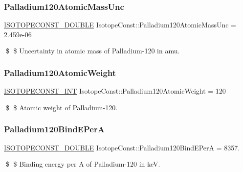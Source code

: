 \subsubsection{\texorpdfstring{Palladium120\+Atomic\+Mass\+Unc}{Palladium120AtomicMassUnc}}
{\footnotesize\ttfamily \mbox{\hyperlink{group___isotope_const-_macros_ga8f45a7272ce02c0b4c65c44636ed719a}{I\+S\+O\+T\+O\+P\+E\+C\+O\+N\+S\+T\+\_\+\+D\+O\+U\+B\+LE}} Isotope\+Const\+::\+Palladium120\+Atomic\+Mass\+Unc = 2.\+459e-\/06}

\$ \$ Uncertainty in atomic mass of Palladium-\/120 in amu. \mbox{\label{group___isotope_const-_palladium-_pd120_gadb79b870281725ce2295581c728921d9}} 
\subsubsection{\texorpdfstring{Palladium120\+Atomic\+Weight}{Palladium120AtomicWeight}}
{\footnotesize\ttfamily \mbox{\hyperlink{group___isotope_const-_macros_ga5f18360b3e99483a35c32d789e62621c}{I\+S\+O\+T\+O\+P\+E\+C\+O\+N\+S\+T\+\_\+\+I\+NT}} Isotope\+Const\+::\+Palladium120\+Atomic\+Weight = 120}

\$ \$ Atomic weight of Palladium-\/120. \mbox{\label{group___isotope_const-_palladium-_pd120_ga3f044373bf4c0c19006aad9205161bb7}} 
\subsubsection{\texorpdfstring{Palladium120\+Bind\+E\+PerA}{Palladium120BindEPerA}}
{\footnotesize\ttfamily \mbox{\hyperlink{group___isotope_const-_macros_ga8f45a7272ce02c0b4c65c44636ed719a}{I\+S\+O\+T\+O\+P\+E\+C\+O\+N\+S\+T\+\_\+\+D\+O\+U\+B\+LE}} Isotope\+Const\+::\+Palladium120\+Bind\+E\+PerA = 8357.}

\$ \$ Binding energy per A of Palladium-\/120 in keV. \mbox{\label{group___isotope_const-_palladium-_pd120_ga0e965ed65e157ee0b2c6218ad7ff8606}} 
